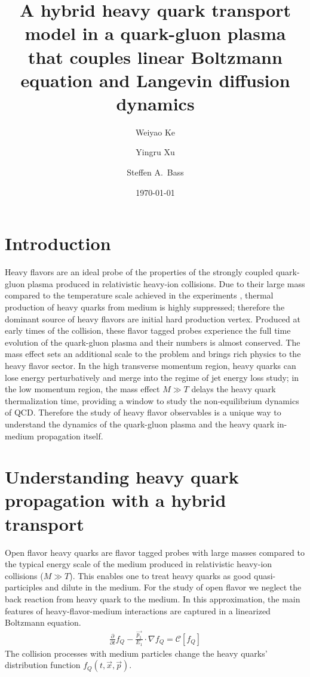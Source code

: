 \documentclass[aps, prc, reprint, amsmath, groupedaddress, nofootinbib]{revtex4-1}
\begin{document}
\title{A hybrid heavy quark transport model in a quark-gluon plasma that couples linear Boltzmann equation and Langevin diffusion dynamics}
\author{Weiyao Ke}
\author{Yingru Xu}
\author{Steffen A.\ Bass}
\date{\today}
\maketitle

\section{Introduction}
Heavy flavors are an ideal probe of the properties of the strongly coupled  quark-gluon plasma produced in relativistic heavy-ion collisions.
Due to their large mass compared to the temperature scale achieved in the experiments \cite{}, thermal production of heavy quarks from medium is highly suppressed; therefore the dominant source of heavy flavors are initial hard production vertex.
Produced at early times of the collision, these flavor tagged probes experience the full time evolution of the quark-gluon plasma and their numbers is almost conserved.
The mass effect sets an additional scale to the problem and brings rich physics to the heavy flavor sector.
In the high transverse momentum region, heavy quarks can lose energy perturbatively and merge into the regime of jet energy loss study;
in the low momentum region, the mass effect $M\gg T$ delays the heavy quark thermalization time, providing a window to study the non-equilibrium dynamics of QCD.
Therefore the study of heavy flavor observables is a unique way to understand the dynamics of the quark-gluon plasma and the heavy quark in-medium propagation itself.


\section{Understanding heavy quark propagation with a hybrid transport}
Open flavor heavy quarks are flavor tagged probes with large masses compared to the typical energy scale of the medium produced in relativistic heavy-ion collisions ($M \gg T$).
This enables one to treat heavy quarks as good quasi-participles and dilute in the medium.
For the study of open flavor we neglect the back reaction from heavy quark to the medium. 
In this approximation, the main features of heavy-flavor-medium interactions are captured in a linearized Boltzmann equation.
\begin{eqnarray}
  \frac{\partial}{\partial t}f_Q - \frac{\vec{p_1}}{E_1}\cdot\nabla f_Q  = 
\mathcal{C}[f_Q]
\end{eqnarray}
The collision processes with medium particles change the heavy quarks' distribution function $f_Q(t, \vec{x}, \vec{p})$.
\end{document}

